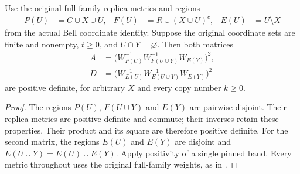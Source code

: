 \begin{theorem}
    \label{thm:bell_metric_factor_positivity}
    \leanok
    Use the original full-family replica metrics and regions
    \begin{align*}
        P(U)&=C\cup X\cup U, &
        F(U)&=R\cup(X\cup U)^c, &
        E(U)&=U\setminus X
    \end{align*}
    from the actual Bell coordinate identity. Suppose the original
    coordinate sets are finite and nonempty, $t\ge0$, and $U\cap Y=\varnothing$.
    Then both matrices
    \begin{align*}
        A&=\bigl(W_{P(U)}^{-1}W_{F(U\cup Y)}^{-1}W_{E(Y)}\bigr)^2,\\
        D&=\bigl(W_{E(U)}^{-1}W_{E(U\cup Y)}^{-1}W_{E(Y)}\bigr)^2
    \end{align*}
    are positive definite, for arbitrary $X$ and every copy number $k\ge0$.
\end{theorem}
\begin{proof}\leanok
    The regions $P(U)$, $F(U\cup Y)$ and $E(Y)$ are pairwise disjoint.
    Their replica metrics are positive definite and commute; their
    inverses retain these properties. Their product and its square
    are therefore positive definite. For the second matrix, the regions
    $E(U)$ and $E(Y)$ are disjoint and
    $E(U\cup Y)=E(U)\cup E(Y)$. Apply positivity of a single pinned band. Every metric throughout uses the
    original full-family weights, as in
    \cite[\texttt{07-comparators.tex}, lines 299--308,
    \texttt{comparator:pinned-metric}]{OpenAI2026AreaLaw}.
\end{proof}

